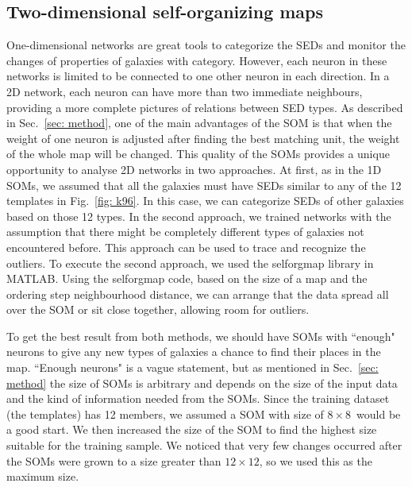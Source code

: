     \subsection{Two-dimensional self-organizing maps}
    \label{sec: 2D}
    One-dimensional networks are great tools to categorize the SEDs and monitor the changes of properties of galaxies with category.
    However, each neuron in these networks is limited to be connected to one other neuron in each direction.
    In a 2D network, each neuron can have more than two immediate neighbours, providing a more complete pictures of relations between SED types.
    As described in Sec.~\ref{sec: method}, one of the main advantages of the SOM is that when the weight of one neuron is adjusted after finding the best matching unit, the weight of the whole map will be changed.
    This quality of the SOMs provides a unique opportunity to analyse 2D networks in two approaches. 
    At first, as in the 1D SOMs, we assumed that all the galaxies must have SEDs similar to any of the 12 templates in Fig.~\ref{fig: k96}.
    In this case, we can categorize SEDs of other galaxies based on those 12 types.
   In the second approach, we trained networks with the assumption that there might be completely different types of galaxies not encountered before.
    This approach can be used to trace and recognize the outliers.
    To execute the second approach, we used the {\tiny selforgmap} library in {\tiny MATLAB}.
    Using the {\tiny selforgmap} code, based on the size of a map and the ordering step neighbourhood distance, we can arrange that the data spread all over the SOM or sit close together, allowing room for outliers.

    To get the best result from both methods, we should have SOMs with ``enough"  neurons to give any new types of galaxies a chance to find their places in the map.
    ``Enough  neurons" is a vague statement, but as mentioned in Sec.~\ref{sec: method} the size of SOMs is arbitrary and depends on the size of the input data and the kind of information needed from the SOMs.
    Since the training dataset (the  templates) has 12 members, we assumed a SOM with size of $8\times8$~would be a good start.
    We then increased the size of the SOM to find the highest size suitable for the training sample.
    We noticed that very few changes occurred after the SOMs were grown to a size greater than $12\times12$, so we used this as the maximum size.
    
